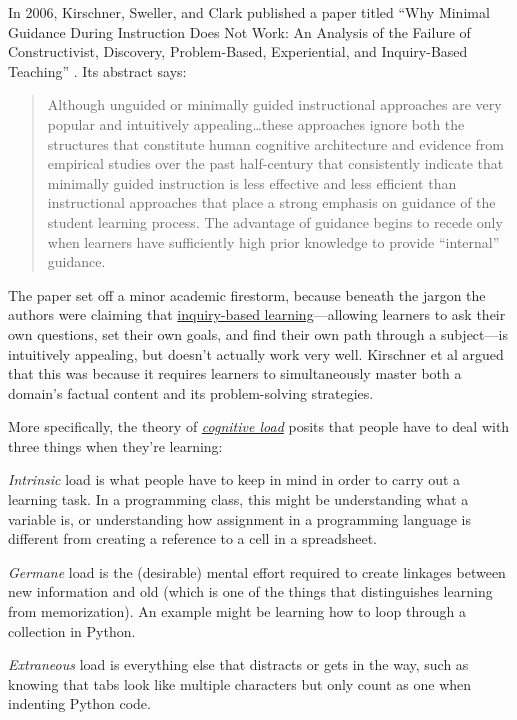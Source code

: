 
In 2006, Kirschner, Sweller, and Clark published a paper titled ``Why
Minimal Guidance During Instruction Does Not Work: An Analysis of the
Failure of Constructivist, Discovery, Problem-Based, Experiential, and
Inquiry-Based Teaching'' \cite{bib:kirschner-minimal}. Its abstract
says:

\begin{quote}

  Although unguided or minimally guided instructional approaches are
  very popular and intuitively appealing\ldots{}these approaches
  ignore both the structures that constitute human cognitive
  architecture and evidence from empirical studies over the past
  half-century that consistently indicate that minimally guided
  instruction is less effective and less efficient than instructional
  approaches that place a strong emphasis on guidance of the student
  learning process. The advantage of guidance begins to recede only
  when learners have sufficiently high prior knowledge to provide
  ``internal'' guidance.

\end{quote}

The paper set off a minor academic firestorm, because beneath the jargon
the authors were claiming that
\href{https://en.wikipedia.org/wiki/Inquiry-based\_learning}{inquiry-based
learning}---allowing learners to ask their own questions, set their
own goals, and find their own path through a subject---is intuitively
appealing, but doesn't actually work very well. Kirschner et al argued
that this was because it requires learners to simultaneously master
both a domain's factual content and its problem-solving strategies.

More specifically, the theory of
\emph{\href{https://en.wikipedia.org/wiki/Cognitive\_load}{cognitive load}}
posits that people have to deal with three things when they're
learning:

\begin{gitemize}

\item
  \emph{Intrinsic} load is what people have to keep in mind in order to
  carry out a learning task.  In a programming class, this might be
  understanding what a variable is, or understanding how assignment in
  a programming language is different from creating a reference to a
  cell in a spreadsheet.

\item
  \emph{Germane} load is the (desirable) mental effort required to
  create linkages between new information and old (which is one of the
  things that distinguishes learning from memorization).  An example
  might be learning how to loop through a collection in Python.

\item
  \emph{Extraneous} load is everything else that distracts or gets in
  the way, such as knowing that tabs look like multiple characters but
  only count as one when indenting Python code.

\end{gitemize}

